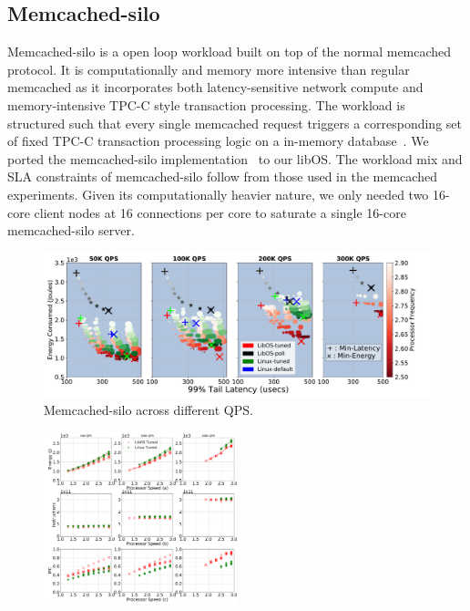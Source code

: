 \subsection{Memcached-silo}
\label{sec:mcdsilo}

Memcached-silo is a open loop workload built on top of the normal memcached protocol. It is computationally and memory more intensive than regular memcached as it incorporates both latency-sensitive network compute and memory-intensive TPC-C style transaction processing. The workload is structured such that every single memcached request triggers a corresponding set of fixed TPC-C transaction processing logic on a in-memory database~\cite{silo}. We ported the memcached-silo implementation~\cite{mcdsilo, zygos} to our libOS. The workload mix and SLA constraints of memcached-silo follow from those used in the memcached experiments. Given its computationally heavier nature, we only needed two 16-core client nodes at 16 connections per core to saturate a single 16-core memcached-silo server. 

\begin{figure}
\centering
\includegraphics[width=1\textwidth]{figures/mcdsilo_overview}
\caption[]
{Memcached-silo across different QPS.}
\label{fig:mcdsilo_overview}
\end{figure}

\begin{figure}
\includegraphics[width=0.5\textwidth]{figures/mcdsilo_detail}
\caption[]{}
\label{fig:mcdsilo_detail}
\end{figure}

